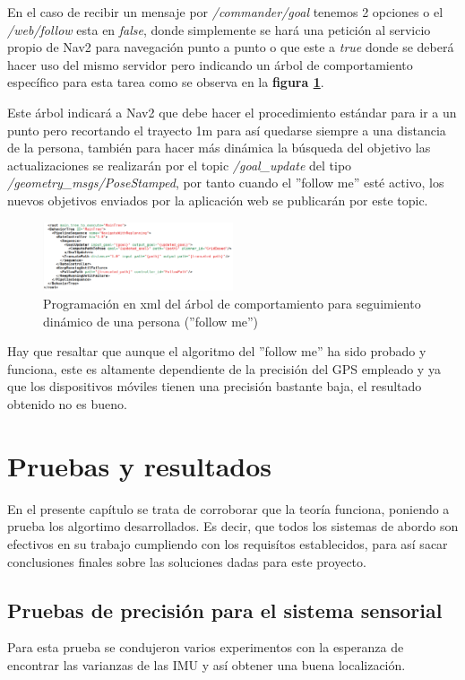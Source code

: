 En el caso de recibir un mensaje por \textit{/commander/goal} tenemos 2 opciones o el \textit{/web/follow} esta en \textit{false}, donde simplemente 
se hará una petición al servicio propio de Nav2 para navegación punto a punto o que este a \textit{true} donde se deberá hacer uso del mismo servidor pero 
indicando un árbol de comportamiento específico para esta tarea como se observa en la \textbf{figura \ref{fig:follow_me}}.

Este árbol indicará a Nav2 que debe hacer el procedimiento estándar para ir a un punto pero recortando el trayecto 1m para así quedarse siempre a una distancia de la persona, también para hacer más dinámica 
la búsqueda del objetivo las actualizaciones se realizarán por el topic \textit{/goal\_update} del tipo \textit{/geometry\_msgs/PoseStamped}, por tanto 
cuando el ''follow me'' esté activo, los nuevos objetivos enviados por la aplicación web se publicarán por este topic.

\begin{figure}[H]
    \centering
    \includegraphics[width=0.5\textwidth]{images/arbol_dynamic.png}
    \caption{Programación en xml del árbol de comportamiento para seguimiento dinámico de una persona (''follow me'')}
    \label{fig:follow_me}
\end{figure}

Hay que resaltar que aunque el algoritmo del ''follow me'' ha sido probado y funciona, este es altamente dependiente de la precisión del GPS 
empleado y ya que los dispositivos móviles tienen una precisión bastante baja, el resultado obtenido no es bueno.
\cleardoublepage
\chapter{Pruebas y resultados}
En el presente capítulo se trata de corroborar que la teoría funciona, poniendo a prueba los algortimo desarrollados. Es decir, que todos los 
sistemas de abordo son efectivos en su trabajo cumpliendo con los requisítos establecidos, para así sacar conclusiones finales sobre las soluciones 
dadas para este proyecto.

\section{Pruebas de precisión para el sistema sensorial}
Para esta prueba se condujeron varios experimentos con la esperanza de encontrar las varianzas de las IMU y así obtener una buena localización.

